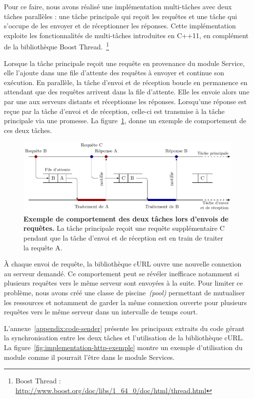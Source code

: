 Pour ce faire, nous avons réalisé une implémentation multi-tâches avec deux tâches parallèles : une tâche principale qui reçoit les requêtes et une tâche qui s'occupe de les envoyer et de réceptionner les réponses. Cette implémentation exploite les fonctionnalités de multi-tâches introduites en C++11, en complément de la bibliothèque Boost Thread.~\footnote{Boost Thread : \url{http://www.boost.org/doc/libs/1_64_0/doc/html/thread.html}}

Lorsque la tâche principale reçoit une requête en provenance du module Service, elle l'ajoute dans une file d'attente des requêtes à envoyer et continue son exécution. En parallèle, la tâche d'envoi et de réception boucle en permanence en attendant que des requêtes arrivent dans la file d'attente. Elle les envoie alors une par une aux serveurs distants et réceptionne les réponses. Lorsqu'une réponse est reçue par la tâche d'envoi et de réception, celle-ci est transmise à la tâche principale via une promesse. La figure~\ref{fig:implementation-http-thread}, donne un exemple de comportement de ces deux tâches.

\begin{figure}[h]
    \centering
    \includegraphics{figures/implementation-thread}
    \caption{\textbf{Exemple de comportement des deux tâches lors d'envois de requêtes.} La tâche principale reçoit une requête supplémentaire C pendant que la tâche d'envoi et de réception est en train de traiter la requête A.}
    \label{fig:implementation-http-thread}
\end{figure}

À chaque envoi de requête, la bibliothèque cURL ouvre une nouvelle connexion au serveur demandé. Ce comportement peut se révéler inefficace notamment si plusieurs requêtes vers le même serveur sont envoyées à la suite. Pour limiter ce problème, nous avons créé une classe de piscine~\emph{(pool)} permettant de mutualiser les ressources et notamment de garder la même connexion ouverte pour plusieurs requêtes vers le même serveur dans un intervalle de temps court.

L'annexe~\ref{appendix:code-sender} présente les principaux extraits du code gérant la synchronisation entre les deux tâches et l'utilisation de la bibliothèque cURL. La figure~\ref{fig:implementation-http-exemple} montre un exemple d'utilisation du module comme il pourrait l'être dans le module Services.

